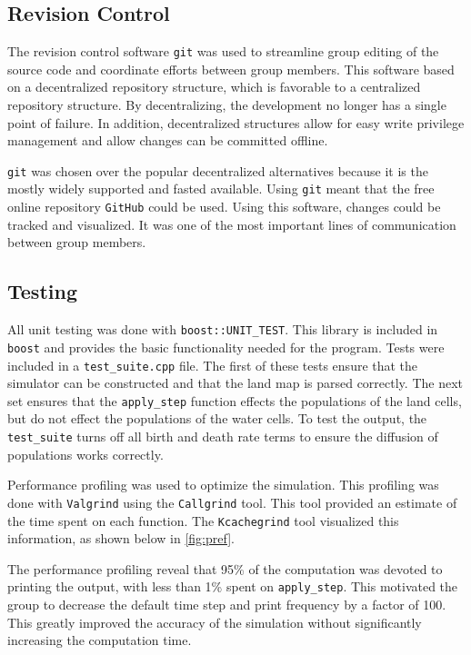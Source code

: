 \documentclass[a4paper,11pt]{article}
\begin{document}
\subsection{Revision Control}

The revision control software \texttt{git} was used to streamline group editing of the source code and coordinate efforts between group members.  This software based on a decentralized repository structure, which is favorable to a centralized repository structure.  By decentralizing, the development no longer has a single point of failure.  In addition, decentralized structures allow for easy write privilege management and allow changes can be committed offline.

\texttt{git} was chosen over the popular decentralized alternatives because it is the mostly widely supported and fasted available.  Using \texttt{git} meant that the free online repository \texttt{GitHub} could be used.  Using this software, changes could be tracked and visualized.  It was one of the most important lines of communication between group members.


\subsection{Testing}\label{test}

All unit testing was done with \texttt{boost::UNIT\_TEST}.  This library is included in \texttt{boost} and provides the basic functionality needed for the program.  Tests were included in a \texttt{test\_suite.cpp} file.  The first of these tests ensure that the simulator can be constructed and that the land map is parsed correctly.  The next set ensures that the \texttt{apply\_step} function effects the populations of the land cells, but do not effect the populations of the water cells.  To test the output, the \texttt{test\_suite} turns off all birth and death rate terms to ensure the diffusion of populations works correctly.   

Performance profiling was used to optimize the simulation.  This profiling was done with \texttt{Valgrind} using the \texttt{Callgrind} tool.  This tool provided an estimate of the time spent on each function.  The \texttt{Kcachegrind} tool visualized this information, as shown below in \ref{fig:pref}.


The performance profiling reveal that 95\% of the computation was devoted to printing the output, with less than 1\% spent on \texttt{apply\_step}.  This motivated the group to decrease the default time step and print frequency by a factor of 100.  This greatly improved the accuracy of the simulation without significantly increasing the computation time.  
\end{document}
